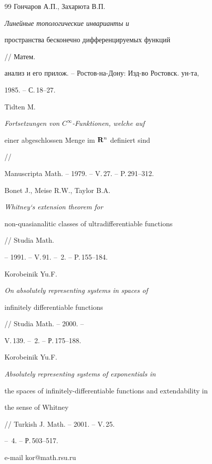 \begin{thebibliography}{99}
Гончаров А.П., Захарюта В.П. {\em Линейные топологические инварианты и


пространства бесконечно дифференцируемых функций} // Матем.


анализ и его прилож. -- Ростов-на-Дону: Изд-во Ростовск. ун-та,


1985. -- С.\,18--27.




Tidten M. {\em Fortsetzungen von $C^{\infty}$-Funktionen, welche auf


einer abgeschlossen Menge im ${\bold R}^n$ definiert sind} //


Manuscripta Math. -- 1979. -- V.\,27. -- P.\,291--312.




Bonet J., Meise R.W., Taylor B.A. {\em Whitney`s extension theorem for


non-quasianalitic classes of ultradifferentiable functions} // Studia Math.


-- 1991. -- V.\,91. -- \No\,2. -- P.\,155--184.




Korobeinik Yu.F. {\em On absolutely representing systems in spaces of


infinitely differentiable functions} // Studia Math. -- 2000. --


V.\,139. -- \No\,2. -- Р.\,175--188.




Korobeinik Yu.F. {\em Absolutely representing systems of exponentials in


the spaces of infinitely-differentiable functions and extendability in


the sense of Whitney} // Turkish J. Math. -- 2001. -- V.\,25.


-- \No\,4. -- Р.\,503--517.





\end{thebibliography}





\vskip 2cm












\label{end}











e-mail kor@math.rsu.ru


